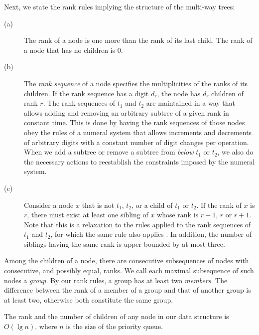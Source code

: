 \documentclass{llncs}
\begin{document}
Next, we state the rank rules implying the structure of the multi-way trees:

\begin{description}
\item[(a)] The rank of a node is one more than the rank of its last
  child.  The rank of a node that has no children is $0$.

\item[(b)] The \emph{rank sequence} of a node specifies the
  multiplicities of the ranks of its children. If the rank sequence
  has a digit $d_r$, the node has $d_r$ children of rank $r$. The rank
  sequences of $t_1$ and $t_2$ are maintained in a way that allows
  adding and removing an arbitrary subtree of a given rank in constant
  time.  This is done by having the rank sequences of those nodes obey
  the rules of a numeral system that allows increments and decrements
  of arbitrary digits with a constant number of digit changes per
  operation.  When we add a subtree or remove a subtree from
  \emph{below} $t_1$ or $t_2$, we also do the necessary actions to
  reestablish the constraints imposed by the numeral system.

\item[(c)] Consider a node $x$ that is not $t_1$, $t_2$, or a child of
  $t_1$ or $t_2$.  If the rank of $x$ is $r$, there must exist at
  least one sibling of $x$ whose rank is $r-1$, $r$ or $r+1$.  Note
  that this is a relaxation to the rules applied to the rank sequences
  of $t_1$ and $t_2$, for which the same rule also applies
  \cite{CK77}.  In addition, the number of siblings having the same
  rank is upper bounded by at most three.
\end{description}

Among the children of a node, there are consecutive subsequences of
nodes with consecutive, and possibly equal, ranks.  We call each
maximal subsequence of such nodes a \emph{group}.  By our rank rules,
a group has at least two \emph{members}.  The difference between the
rank of a member of a group and that of another group is at least two,
otherwise both constitute the same group.

\begin{lemma}
\label{log}
The rank and the number of children of any node in our data structure is
$O(\lg{n})$, where $n$ is the size of the priority queue.
\end{lemma}
\end{document}
